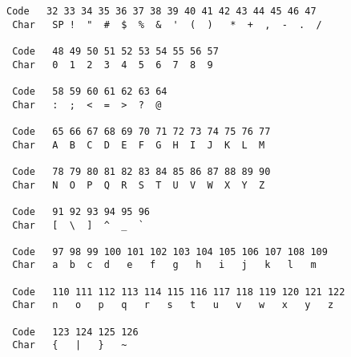 \begin{table}[h!]
\begin{jjjlisting}
\begin{lstlisting}[stringstyle=\color{black}]
 Code   32 33 34 35 36 37 38 39 40 41 42 43 44 45 46 47
 Char   SP !  "  #  $  %  &  '  (  )   *  +  ,  -  .  /

 Code   48 49 50 51 52 53 54 55 56 57
 Char   0  1  2  3  4  5  6  7  8  9

 Code   58 59 60 61 62 63 64
 Char   :  ;  <  =  >  ?  @

 Code   65 66 67 68 69 70 71 72 73 74 75 76 77
 Char   A  B  C  D  E  F  G  H  I  J  K  L  M

 Code   78 79 80 81 82 83 84 85 86 87 88 89 90
 Char   N  O  P  Q  R  S  T  U  V  W  X  Y  Z

 Code   91 92 93 94 95 96
 Char   [  \  ]  ^  _  `

 Code   97 98 99 100 101 102 103 104 105 106 107 108 109
 Char   a  b  c  d   e   f   g   h   i   j   k   l   m

 Code   110 111 112 113 114 115 116 117 118 119 120 121 122
 Char   n   o   p   q   r   s   t   u   v   w   x   y   z

 Code   123 124 125 126
 Char   {   |   }   ~
\end{lstlisting}
\end{jjjlisting}
\end{table}

